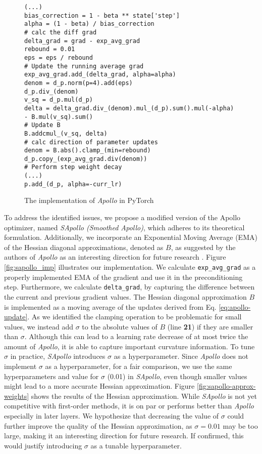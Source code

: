 \begin{figure}[H]
\begin{verbatim}
(...)
bias_correction = 1 - beta ** state['step']
alpha = (1 - beta) / bias_correction
# calc the diff grad
delta_grad = grad - exp_avg_grad
rebound = 0.01
eps = eps / rebound
# Update the running average grad
exp_avg_grad.add_(delta_grad, alpha=alpha)
denom = d_p.norm(p=4).add(eps)
d_p.div_(denom)
v_sq = d_p.mul(d_p)
delta = delta_grad.div_(denom).mul_(d_p).sum().mul(-alpha) 
- B.mul(v_sq).sum()
# Update B
B.addcmul_(v_sq, delta)
# calc direction of parameter updates
denom = B.abs().clamp_(min=rebound)
d_p.copy_(exp_avg_grad.div(denom))
# Perform step weight decay
(...)
p.add_(d_p, alpha=-curr_lr)
\end{verbatim}
    \caption{The implementation of \emph{Apollo} in PyTorch}
    \label{fig:apollo_imp}
    \end{figure}
    To address the identified issues, we propose a modified version of the Apollo optimizer, named \emph{SApollo (Smoothed Apollo)}, which adheres to its theoretical formulation. Additionally, we incorporate an Exponential Moving Average (EMA) of the Hessian diagonal approximations, denoted as $B$, as suggested by the authors of \emph{Apollo} as an interesting direction for future research \cite{apollo}.
    Figure \ref{fig:sapollo_imp} illustrates our implementation. We calculate \texttt{exp\_avg\_grad} as a properly implemented EMA of the gradient and use it in the preconditioning step.
    Furthermore, we calculate \texttt{delta\_grad}, by capturing the difference between the current and previous gradient values.
    The Hessian diagonal approximation $B$ is implemented as a moving average of the updates derived from Eq. \ref{eq:apollo-update}.
    As we identified the clamping operation to be problematic for small values, we instead add $\sigma$ to the absolute values of $B$ (line \textbf{21}) if they are smaller than $\sigma$.
    Although this can lead to a learning rate decrease of at most twice the amount of \emph{Apollo}, it is able to capture
    important curvature information. To tune $\sigma$ in practice, \emph{SApollo} introduces $\sigma$ as a hyperparameter.
    Since \emph{Apollo} does not implement $\sigma$ as a hyperparameter, for a fair comparison, we use the same hyperparameters and  value for $\sigma$ (0.01) in \emph{SApollo}, even though smaller values might lead to a more accurate Hessian approximation.
    Figure \ref{fig:sapollo-approx-weights} shows the results of the Hessian approximation. 
    While \emph{SApollo} is not yet competitive with first-order methods, it is on par or performs better than \emph{Apollo} especially in later layers.
    We hypothesize that decreasing the value of $\sigma$ could further improve the quality of the Hessian approximation, as $\sigma=0.01$ may be too large,
    making it an interesting direction for future research.
    If confirmed, this would justify introducing $\sigma$ as a tunable hyperparameter.


